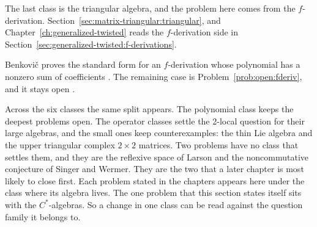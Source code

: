 The last class is the triangular algebra, and the problem here comes from the
$f$-derivation.
Section~\ref{sec:matrix-triangular:triangular}, and
Chapter~\ref{ch:generalized-twisted} reads the $f$-derivation side in
Section~\ref{sec:generalized-twisted:f-derivations}.

Benkovi\v{c} proves the standard form for an $f$-derivation whose polynomial
has a nonzero sum of coefficients \cite[Theorem~1.1]{Benkovic2014}.
The remaining case is Problem~\ref{prob:open:fderiv}, and it stays open
\cite[Problem~1.2]{Benkovic2014}.

Across the six classes the same split appears.
The polynomial class keeps the deepest problems open.
The operator classes settle the 2-local question for
their large algebras, and the small ones keep counterexamples: the thin Lie
algebra and the upper triangular complex $2\times2$ matrices. Two problems
have no class that settles them, and they are the reflexive space of Larson
and the noncommutative conjecture of Singer and Wermer. They are the two that
a later chapter is most likely to close first. Each problem stated in the
chapters appears here under the class where its algebra lives. The one problem
that this section states itself sits with the $C^{*}$-algebras. So a change in
one class can be read against the question family it belongs to.
